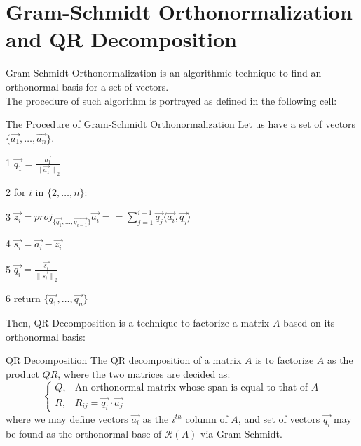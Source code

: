 \section{Gram-Schmidt Orthonormalization and QR Decomposition}
Gram-Schmidt Orthonormalization is an algorithmic technique to find an orthonormal basis for a set of vectors. \\
The procedure of such algorithm is portrayed as defined in the following cell:
\begin{ln-define}{The Procedure of Gram-Schmidt Orthonormalization}{}
    Let us have a set of vectors $\{\vec{a_1}, \dots, \vec{a_n}\}$.
    \begin{bindenum}
        \item[1] $\vec{q_1} = \frac{\vec{a_1}}{{\lVert \vec{a_1} \rVert}_2}$
        \item[2] for $i$ in $\{2, \dots, n\}$:
        \item[3] \hspace{0.6cm} $\vec{z_i} = {proj}_{\{\vec{q_1}, \dots, \vec{q_{i - 1}}\}} \vec{a_i} = = \sum_{j = 1}^{i - 1} \vec{q_j} \langle \vec{a_i}, \vec{q_j} \rangle$
        \item[4] \hspace{0.6cm} $\vec{s_i} = \vec{a_i} - \vec{z_i}$
        \item[5] \hspace{0.6cm} $\vec{q_i} = \frac{\vec{s_i}}{{\lVert \vec{s_i} \rVert}_2}$
        \item[6] return $\{\vec{q_1}, \dots, \vec{q_n}\}$
    \end{bindenum}
\end{ln-define}
\par
Then, QR Decomposition is a technique to factorize a matrix $A$ based on its orthonormal basis:
\begin{ln-define}{QR Decomposition}{}
    The QR decomposition of a matrix $A$ is to factorize $A$ as the product $QR$, where the two matrices are decided as:
    \[
        \begin{cases}
            Q, &\text{An orthonormal matrix whose span is equal to that of $A$} \\
            R, &R_{ij} = \vec{q_i} \cdot \vec{a_j}
        \end{cases}
    \]
    where we may define vectors $\vec{a_i}$ as the $i^{th}$ column of $A$, and set of vectors $\vec{q_i}$ may be found as the orthonormal base of $\mathcal{R}(A)$ via Gram-Schmidt.
\end{ln-define}
